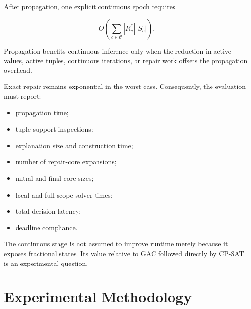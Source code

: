 \documentclass[pdflatex,sn-mathphys-num,iicol,oneside]{sn-jnl}
\begin{document}
After propagation, one explicit continuous epoch requires

\begin{equation}
O\left(
\sum_{c\in\mathcal{C}}
|R_c^{*}|\,|S_c|
\right).
\label{eq:continuous-cost}
\end{equation}

Propagation benefits continuous inference only when the reduction in
active values, active tuples, continuous iterations, or repair work
offsets the propagation overhead.

Exact repair remains exponential in the worst case. Consequently, the
evaluation must report:

\begin{itemize}
    \item propagation time;
    \item tuple-support inspections;
    \item explanation size and construction time;
    \item number of repair-core expansions;
    \item initial and final core sizes;
    \item local and full-scope solver times;
    \item total decision latency;
    \item deadline compliance.
\end{itemize}

The continuous stage is not assumed to improve runtime merely because
it exposes fractional states. Its value relative to GAC followed
directly by CP-SAT is an experimental question.



\section{Experimental Methodology}
\label{sec:experiments}
\end{document}
